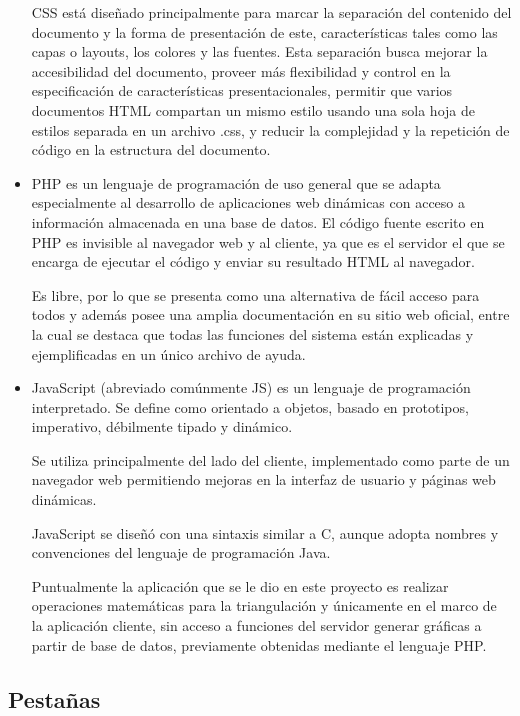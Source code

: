 \begin{itemize}
    \par CSS está diseñado principalmente para marcar la separación del contenido del documento y la forma de presentación de este, características tales como las 
capas o layouts, los colores y las fuentes. Esta separación busca mejorar la accesibilidad del documento, proveer más flexibilidad y control en la especificación 
de características presentacionales, permitir que varios documentos HTML compartan un mismo estilo usando una sola hoja de estilos separada en un archivo .css, y 
reducir la complejidad y la repetición de código en la estructura del documento.

    \item \par PHP es un lenguaje de programación de uso general que se adapta especialmente al desarrollo de aplicaciones web dinámicas con acceso a información 
almacenada en una base de datos. El código fuente escrito en PHP es invisible al navegador web y al cliente, ya que es el servidor el que se encarga de ejecutar 
el código y enviar su resultado HTML al navegador.
    \par Es libre, por lo que se presenta como una alternativa de fácil acceso para todos y además posee una amplia documentación en su sitio web oficial, 
entre la cual se destaca que todas las funciones del sistema están explicadas y ejemplificadas en un único archivo de ayuda.
    
    \item \par JavaScript (abreviado comúnmente JS) es un lenguaje de programación interpretado. Se define como orientado a objetos, basado en prototipos, 
imperativo, débilmente tipado y dinámico.
    \par Se utiliza principalmente del lado del cliente, implementado como parte de un navegador web permitiendo mejoras en la interfaz de usuario y páginas 
web dinámicas. 
    \par JavaScript se diseñó con una sintaxis similar a C, aunque adopta nombres y convenciones del lenguaje de programación Java. 
    \par Puntualmente la aplicación que se le dio en este proyecto es realizar operaciones matemáticas para la triangulación y únicamente en el marco de 
la aplicación cliente, sin acceso a funciones del servidor generar gráficas a partir de base de datos, previamente obtenidas mediante el lenguaje PHP. 
\end{itemize}

\subsection{Pestañas}
